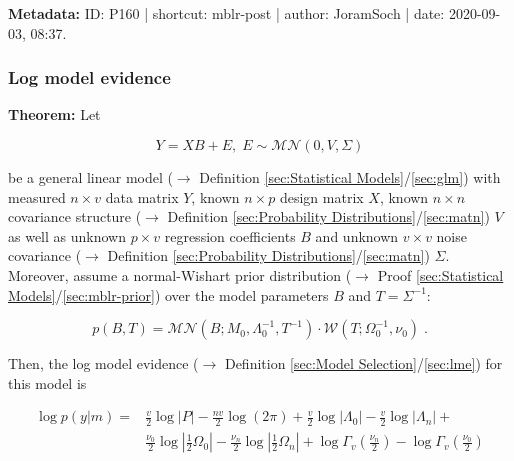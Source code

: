 \documentclass[a4paper,12pt,twoside]{book}
\begin{document}
\vspace{1em}
\textbf{Metadata:} ID: P160 | shortcut: mblr-post | author: JoramSoch | date: 2020-09-03, 08:37.
\vspace{1em}



\subsubsection[\textbf{Log model evidence}]{Log model evidence} \label{sec:mblr-lme}
\setcounter{equation}{0}

\textbf{Theorem:} Let

\begin{equation} \label{eq:mblr-lme-GLM}
Y = X B + E, \; E \sim \mathcal{MN}(0, V, \Sigma)
\end{equation}

be a general linear model ($\rightarrow$ Definition \ref{sec:Statistical Models}/\ref{sec:glm}) with measured $n \times v$ data matrix $Y$, known $n \times p$ design matrix $X$, known $n \times n$ covariance structure ($\rightarrow$ Definition \ref{sec:Probability Distributions}/\ref{sec:matn}) $V$ as well as unknown $p \times v$ regression coefficients $B$ and unknown $v \times v$ noise covariance ($\rightarrow$ Definition \ref{sec:Probability Distributions}/\ref{sec:matn}) $\Sigma$. Moreover, assume a normal-Wishart prior distribution ($\rightarrow$ Proof \ref{sec:Statistical Models}/\ref{sec:mblr-prior}) over the model parameters $B$ and $T = \Sigma^{-1}$:

\begin{equation} \label{eq:mblr-lme-GLM-NW-prior}
p(B,T) = \mathcal{MN}(B; M_0, \Lambda_0^{-1}, T^{-1}) \cdot \mathcal{W}(T; \Omega_0^{-1}, \nu_0) \; .
\end{equation}

Then, the log model evidence ($\rightarrow$ Definition \ref{sec:Model Selection}/\ref{sec:lme}) for this model is

\begin{equation} \label{eq:mblr-lme-GLM-NW-LME}
\begin{split}
\log p(y|m) = & \frac{v}{2} \log |P| - \frac{nv}{2} \log (2 \pi)  + \frac{v}{2} \log |\Lambda_0| - \frac{v}{2} \log |\Lambda_n| + \\
& \frac{\nu_0}{2} \log\left| \frac{1}{2} \Omega_0 \right| - \frac{\nu_n}{2} \log\left| \frac{1}{2} \Omega_n \right| + \log \Gamma_v \left( \frac{\nu_n}{2} \right) - \log \Gamma_v \left( \frac{\nu_0}{2} \right)
\end{split}
\end{equation}
\end{document}
